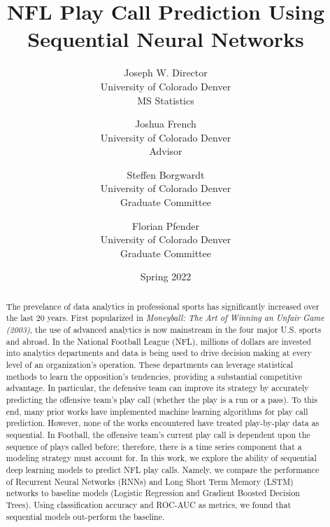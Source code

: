 \documentclass[11pt]{article}
\title{NFL Play Call Prediction Using Sequential Neural Networks}
\author{Joseph W. Director  \\
	University of Colorado Denver \\
    MS Statistics
	\and 
	Joshua French \\
    University of Colorado Denver \\
    Advisor
    \and
    Steffen Borgwardt \\
    University of Colorado Denver \\
    Graduate Committee
    \and
    Florian Pfender \\
    University of Colorado Denver \\
    Graduate Committee
	}
\date{Spring 2022}
\begin{document}
    
    \maketitle

    \begin{abstract}
        \centering\begin{minipage}{\dimexpr\paperwidth-12cm}
        The prevelance of data analytics in professional sports has significantly increased over the last 20 years. 
        First popularized in \emph{Moneyball: The Art of Winning an Unfair Game (2003)}, the use of advanced analytics is now mainstream in the four major U.S. sports and abroad. 
        In the National Football League (NFL), millions of dollars are invested into analytics departments and data is being used to drive decision making at every level of an organization's operation. 
        These departments can leverage statistical methods to learn the opposition's tendencies, providing a substantial competitive advantage. 
        In particular, the defensive team can improve its strategy by accurately predicting the offensive team's play call (whether the play is a run or a pass). 
        To this end, many prior works have implemented machine learning algorithms for play call prediction. 
        However, none of the works encountered have treated play-by-play data as sequential. 
        In Football, the offensive team's current play call is dependent upon the sequence of plays called before; therefore, there is a time series component that a modeling strategy must account for. 
        In this work, we explore the ability of sequential deep learning models to predict NFL play calls.
        Namely, we compare the performance of Recurrent Neural Networks (RNNs) and Long Short Term Memory (LSTM) networks to baseline models (Logistic Regression and Gradient Boosted Decision Trees). 
        Using classification accuracy and ROC-AUC as metrics, we found that sequential models out-perform the baseline. 
        \end{minipage}
    \end{abstract}
    
    \pagebreak

    \tableofcontents
    \newpage

\end{document}
